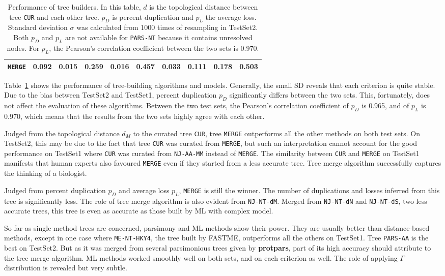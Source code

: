 \begin{table}[!hb]
\begin{center}
\begin{tabular}{|l|cc|cc|cc|ccc|}
{\tt MERGE}      & 0.092 & 0.015 & 0.259 & 0.016 & 0.457 & 0.033 & 0.111 & 0.178 & 0.503 \\
\hline
\end{tabular}
\caption[Performance of tree builders]{Performance of tree builders. In this table,
	$d$ is the topological distance between tree {\tt CUR} and each other tree.
	$p_D$ is percent duplication and $p_L$ the average loss. Standard deviation $\sigma$
	was calculated from 1000 times of resampling in {\sf TestSet2}. Both $p_D$ and $p_L$ are not available
	for {\tt PARS-NT} because it contains unresolved nodes.
	For $p_L$, the Pearson's correlation coefficient
	between the two sets is 0.970.}\label{tab:perform}
\end{center}
\end{table}

Table~\ref{tab:perform} shows the performance of tree-building algorithms and models.
Generally, the small SD reveals that each criterion is quite stable. Due to the
bias between {\sf TestSet2} and {\sf TestSet1}, percent duplication $p_D$ significantly
differs between the two sets. This, fortunately, does not affect the evaluation of
these algorithms. Between the two test sets, the Pearson's correlation coefficient of $p_D$ is 0.965,
and of $p_L$ is 0.970, which means that the results from the two sets highly agree with
each other.

Judged from the topological distance $d_M$ to the curated tree {\tt CUR},
tree {\tt MERGE} outperforms all the other methods on both test sets. On {\sf TestSet2},
this may be due to the fact that tree {\tt CUR} was curated from {\tt MERGE}, but
such an interpretation cannot account for the good performance on {\sf TestSet1}
where {\tt CUR} was curated from {\tt NJ-AA-MM} instead of {\tt MERGE}.
The similarity between {\tt CUR} and {\tt MERGE} on {\sf TestSet1} manifests that
human experts also favoured {\tt MERGE} even if they started from a less accurate tree.
Tree merge algorithm successfully captures the thinking of a biologist.

Judged from percent
duplication $p_D$ and average loss $p_L$, {\tt MERGE} is still the winner.
The number of duplications and losses inferred from this tree is significantly less.
The role of tree merge algorithm is also evident from {\tt NJ-NT-dM}. Merged
from {\tt NJ-NT-dN} and {\tt NJ-NT-dS}, two less accurate trees, this tree is even as accurate as those built by ML
with complex model.

So far as single-method trees are concerned, parsimony and ML methods show their power.
They are usually better than distance-based methods, except in one case where {\tt ME-NT-HKY4},
the tree built by FASTME, outperforms all the others on {\sf TestSet1}. Tree {\tt PARS-AA}
is the best on {\sf TestSet2}. But as it was merged from several parsimonious trees given by
{\bf protpars}, part of its high accuracy should attribute to the tree merge algorithm.
ML methods worked smoothly well on both sets, and on each criterion as well.
The role of applying $\Gamma$ distribution is revealed but very subtle.

